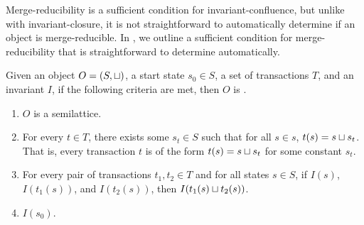 Merge-reducibility is a sufficient condition for invariant-confluence, but
unlike with invariant-closure, it is not straightforward to automatically
determine if an object is merge-reducible. In , we
outline a sufficient condition for merge-reducibility that is straightforward
to determine automatically.

\begin{theorem}
  Given an object $O = (S, \sqcup)$, a start state $s_0 \in S$, a set of
  transactions $T$, and an invariant $I$, if the following criteria are met,
  then $O$ is \sTIconfluent{}.
  \begin{enumerate}
    \item
      $O$ is a semilattice.

    \item
      For every $t \in T$, there exists some $s_t \in S$ such that for all $s
      \in s$, $t(s) = s \sqcup s_t$. That is, every transaction $t$ is of the
      form $t(s) = s \sqcup s_t$ for some constant $s_t$.

    \item
      For every pair of transactions $t_1, t_2 \in T$ and for all states $s \in
      S$, if $I(s)$, $I(t_1(s))$, and $I(t_2(s))$, then $I(t_1(s) \sqcup
      t_2(s))$.

    \item
      $I(s_0)$.
  \end{enumerate}
\end{theorem}

